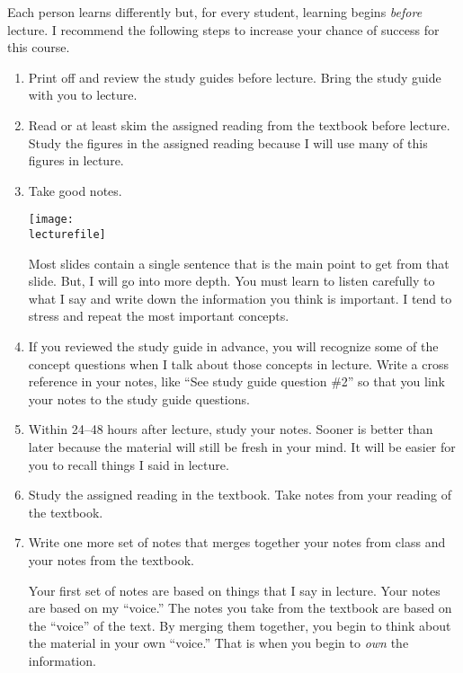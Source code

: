 \documentclass[letterpaper]{tufte-handout}
\newcommand\lecturefile{163_lecture00_fullsize}
\begin{document}
Each person learns differently but, for every student, learning begins \emph{before} lecture.  I recommend the following steps to increase your chance of success for this course. 


\begin{enumerate}

	\item Print off and review the study guides before lecture. Bring the study guide with you to lecture.
	
	\item Read or at least skim the assigned reading from the textbook before lecture. Study the figures in the assigned reading because I will use many of this figures in lecture.
	
	\item Take good notes.\begin{marginfigure}\texttt{[image: \\lecturefile]}\end{marginfigure} Most slides contain a single sentence that is the main point to get from that slide. But, I will go into more depth. You must learn to listen carefully to what I say and write down the information you think is important. I tend to stress and repeat the most important concepts. 
	
	\item If you reviewed the study guide in advance, you will recognize some of the concept questions when I talk about those concepts in lecture. Write a cross reference in your notes, like “See study guide question \#2” so that you link your notes to the study guide questions.
	
	\item Within 24–48 hours after lecture, study your notes.  Sooner is better than later because the material will still be fresh in your mind. It will be easier for you to recall things I said in lecture.
	
	\item Study the assigned reading in the textbook. Take notes from your reading of the textbook.
	
	\item Write one more set of notes that merges together your notes from class and your notes from the textbook.  
	
	Your first set of notes are based on things that I say in lecture. Your notes are based on my “voice.” The notes you take from the textbook are based on the “voice” of the text. By merging them together, you begin to think about the material in your own “voice.” That is when you begin to \emph{own} the information.
	

\end{enumerate}
\end{document}
